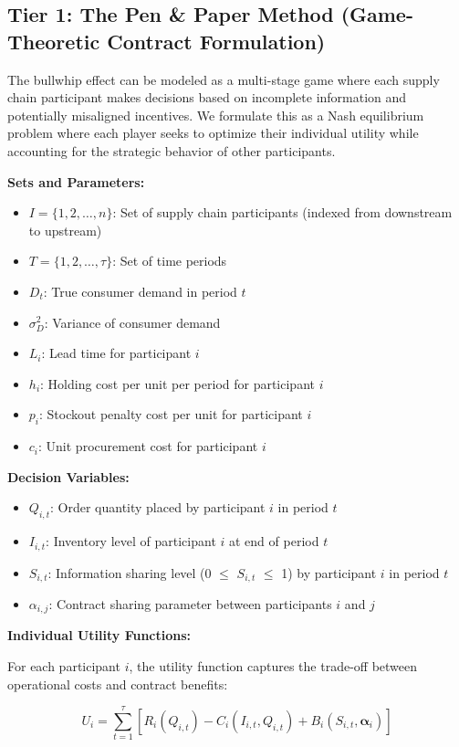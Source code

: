 \documentclass{article}
\begin{document}
\subsection{Tier 1: The Pen \& Paper Method (Game-Theoretic Contract Formulation)}

The bullwhip effect can be modeled as a multi-stage game where each supply chain participant makes decisions based on incomplete information and potentially misaligned incentives. We formulate this as a Nash equilibrium problem where each player seeks to optimize their individual utility while accounting for the strategic behavior of other participants.

\textbf{Sets and Parameters:}
\begin{itemize}
\item $I = \{1, 2, \ldots, n\}$: Set of supply chain participants (indexed from downstream to upstream)
\item $T = \{1, 2, \ldots, \tau\}$: Set of time periods
\item $D_t$: True consumer demand in period $t$
\item $\sigma_D^2$: Variance of consumer demand
\item $L_i$: Lead time for participant $i$
\item $h_i$: Holding cost per unit per period for participant $i$
\item $p_i$: Stockout penalty cost per unit for participant $i$
\item $c_i$: Unit procurement cost for participant $i$
\end{itemize}

\textbf{Decision Variables:}
\begin{itemize}
\item $Q_{i,t}$: Order quantity placed by participant $i$ in period $t$
\item $I_{i,t}$: Inventory level of participant $i$ at end of period $t$
\item $S_{i,t}$: Information sharing level (0 $\leq$ $S_{i,t}$ $\leq$ 1) by participant $i$ in period $t$
\item $\alpha_{i,j}$: Contract sharing parameter between participants $i$ and $j$
\end{itemize}

\textbf{Individual Utility Functions:}

For each participant $i$, the utility function captures the trade-off between operational costs and contract benefits:

\[
U_i = \sum_{t=1}^{\tau} \left[ R_i(Q_{i,t}) - C_i(I_{i,t}, Q_{i,t}) + B_i(S_{i,t}, \boldsymbol{\alpha}_i) \right]
\]
\end{document}
